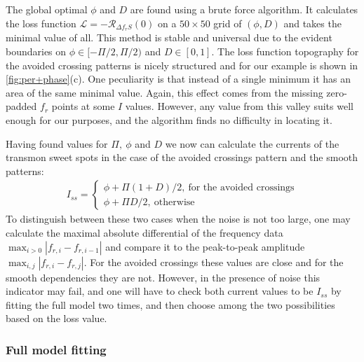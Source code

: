 \documentclass[%
 aip,
 amsmath,amssymb,
 reprint,%
]{revtex4-1}
\begin{document}
The global optimal $\phi$ and $D$ are found using a brute force algorithm. It calculates the loss function $\mathcal{L} = - \mathcal{R}_{\Delta f_r S}(0)$ on a $50 \times 50$ grid of $(\phi, D)$ and takes the minimal value of all. This method is stable and universal due to the evident boundaries on $\phi \in [-\Pi/2,\Pi/2)$ and $D \in [0, 1]$. The loss function topography for the avoided crossing patterns is nicely structured and for our example is shown in \autoref{fig:per+phase}(c). One peculiarity is that instead of a single minimum it has an area of the same minimal value. Again, this effect comes from the missing zero-padded $f_r$ points at some $I$ values. However, any value from this valley suits well enough for our purposes, and the algorithm finds no difficulty in locating it.

Having found values for $\Pi,\ \phi$ and $D$ we now can calculate the currents of the transmon sweet spots in the case of the avoided crossings pattern and the smooth patterns:
\begin{align}
I_{ss} = 
\begin{cases}
 \phi + \Pi (1+D)/2,\ \text{for the avoided crossings}\\
 \phi + \Pi D/2 ,\ \text{otherwise}
\end{cases}
\end{align}
To distinguish between these two cases when the noise is not too large, one may calculate the maximal absolute differential of the frequency data $\max_{i>0} |f_{r,i} - f_{{r,i}-1}|$ and compare it to the peak-to-peak amplitude $\max_{i,j} | f_{r,i} - f_{r, j}|$. For the avoided crossings these values are close and for the smooth dependencies they are not. However, in the presence of noise this indicator may fail, and one will have to check both current values to be $I_{ss}$ by fitting the full model two times, and then choose among the two possibilities based on the loss value.


\subsubsection{Full model fitting}
\end{document}
